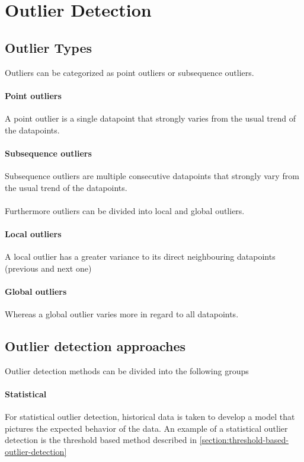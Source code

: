 \chapter{Outlier Detection}
\section{Outlier Types}\label{section:outlier-detection}
Outliers can be categorized as point outliers or subsequence outliers.
\subsubsection{Point outliers}
A point outlier is a single datapoint that strongly varies from the usual trend of the datapoints. \cite{blazquez-garciaReviewOutlierAnomaly2020}

\subsubsection{Subsequence outliers}
Subsequence outliers are multiple consecutive datapoints that strongly vary from the usual trend of the datapoints. \cite{blazquez-garciaReviewOutlierAnomaly2020}\\\\
Furthermore outliers can be divided into local and global outliers. 
\subsubsection{Local outliers}
A local outlier has a greater variance to its direct neighbouring datapoints (previous and next one) \cite{blazquez-garciaReviewOutlierAnomaly2020}

\subsubsection{Global outliers}
Whereas a global outlier varies more in regard to all datapoints.
\cite{blazquez-garciaReviewOutlierAnomaly2020}

\section{Outlier detection approaches}\label{section:outlier-detection-approaches}
Outlier detection methods can be divided into the following groups
\subsubsection{Statistical}
For statistical outlier detection, historical data is taken to develop a model that pictures the expected behavior of the data. An example of a statistical outlier detection is the threshold based method described in \autoref{section:threshold-based-outlier-detection} \cite{cookAnomalyDetectionIoT2020, giannoniAnomalyDetectionModels2018}

